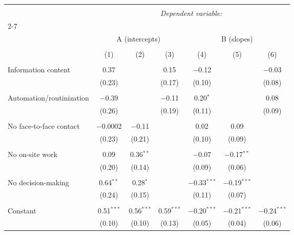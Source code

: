 

\begin{sidewaystable}[!htbp] \centering 
  \caption{Intercept and Slope of Change in Wage Quantiles, 1981/2 - 2011/12} 
  \label{tab:quantreg1} 
\begin{tabular}{@{\extracolsep{0pt}}lcccccc} 
\\[-1.8ex]\hline 
\hline \\[-1.8ex] 
 & \multicolumn{6}{c}{\textit{Dependent variable:}} \\ 
\cline{2-7} 
\\[-1.8ex] & \multicolumn{3}{c}{A (intercepts)} & \multicolumn{3}{c}{B (slopes)} \\ 
\\[-1.8ex] & (1) & (2) & (3) & (4) & (5) & (6)\\ 
\hline \\[-1.8ex] 
 Information content & 0.37 &  & 0.15 & $-$0.12 &  & $-$0.03 \\ 
  & (0.23) &  & (0.17) & (0.10) &  & (0.08) \\ 
  & & & & & & \\ 
 Automation/routinization & $-$0.39 &  & $-$0.11 & 0.20$^{*}$ &  & 0.08 \\ 
  & (0.26) &  & (0.19) & (0.11) &  & (0.09) \\ 
  & & & & & & \\ 
 No face-to-face contact & $-$0.0002 & $-$0.11 &  & 0.02 & 0.09 &  \\ 
  & (0.23) & (0.21) &  & (0.10) & (0.09) &  \\ 
  & & & & & & \\ 
 No on-site work & 0.09 & 0.36$^{**}$ &  & $-$0.07 & $-$0.17$^{**}$ &  \\ 
  & (0.20) & (0.14) &  & (0.09) & (0.06) &  \\ 
  & & & & & & \\ 
 No decision-making & 0.64$^{**}$ & 0.28$^{*}$ &  & $-$0.33$^{***}$ & $-$0.19$^{***}$ &  \\ 
  & (0.24) & (0.15) &  & (0.11) & (0.07) &  \\ 
  & & & & & & \\ 
 Constant & 0.51$^{***}$ & 0.56$^{***}$ & 0.59$^{***}$ & $-$0.20$^{***}$ & $-$0.21$^{***}$ & $-$0.24$^{***}$ \\ 
  & (0.10) & (0.10) & (0.13) & (0.05) & (0.04) & (0.06) \\ 

\end{tabular}
\end{sidewaystable}
